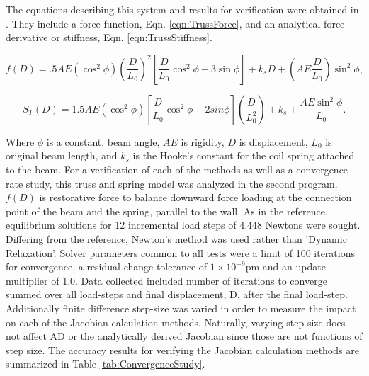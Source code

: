 \documentclass[preprint,12pt]{elsarticle}
\begin{document}
%
The equations describing this system and results for verification were obtained
in \cite{rezaiee2010dynamic}. They include a force function, Eqn.
\ref{eqn:TrussForce}, and an analytical force derivative or stiffness, Eqn.
\ref{eqn:TrussStiffness}.

\begin{equation} 
    \label{eqn:TrussForce}
    f(D) = .5AE(\cos^{2}\phi)(\frac{D}{L_{0}})^{2}[\frac{D}{L_{0}}\cos^{2}\phi - 3\sin\phi] + k_{s}D + (AE\frac{D}{L_{0}})\sin^{2}\phi,
\end{equation} 

\begin{equation} 
    \label{eqn:TrussStiffness}
    S_{T}(D) = 1.5AE(\cos^{2}\phi)[\frac{D}{L_{0}}\cos^{2}\phi - 2sin\phi](\frac{D}{L_{0}^{2}}) + k_{s} + \frac{AE\sin^{2}\phi}{L_{0}}.
\end{equation}

Where $\phi$ is a constant, beam angle, $AE$ is rigidity, $D$ is displacement,
$L_{0}$ is original beam length, and $k_{s}$ is the Hooke's constant for the
coil spring attached to the beam. For a verification of each of the methods as
well as a convergence rate study, this truss and spring model was analyzed in
the second program. $f(D)$ is restorative force to balance downward force
loading at the connection point of the beam and the spring, parallel to the
wall. As in the reference, equilibrium solutions for 12 incremental load steps
of 4.448 Newtons were sought. Differing from the reference, Newton's method was
used rather than 'Dynamic Relaxation'. Solver parameters common to all tests
were a limit of 100 iterations for convergence, a residual change tolerance of
$1\times{10^{-9}} \si{\pico\meter}$ and an update multiplier of 1.0. Data
collected included number of iterations to converge summed over all load-steps
and final displacement, D, after the final load-step. Additionally
finite difference step-size was varied in order to measure the impact on each
of the Jacobian calculation methods. Naturally, varying step size does not
affect AD or the analytically derived Jacobian since those are not functions
of step size. The accuracy results for
verifying the Jacobian calculation methods are summarized in Table
\ref{tab:ConvergenceStudy}. 
\end{document}

